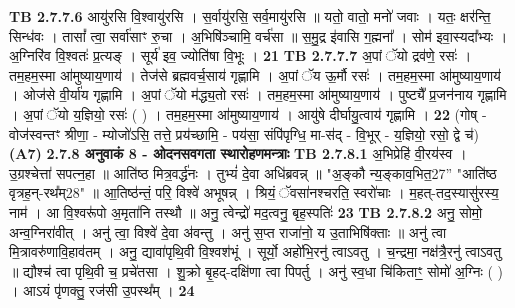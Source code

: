 \documentclass[17pt]{extarticle}
\begin{document}
{                  \newline
                                \textbf{ TB 2.7.7.6} \newline
                  आयु॑रसि वि॒श्वायु॑रसि । स॒र्वायु॑रसि॒ सर्व॒मायु॑रसि ॥ यतो॒ वातो॒ मनो॑ जवाः । यतः॒ क्षर॑न्ति॒ सिन्ध॑वः । तासां᳚ त्वा॒ सर्वा॑साꣳ रु॒चा । अ॒भिषि॑ञ्चामि॒ वर्च॑सा ॥ स॒मु॒द्र इ॑वासि ग॒ह्मना᳚ । सोम॑ इवा॒स्यदा᳚भ्यः । अ॒ग्निरि॑व वि॒श्वतः॑ प्र॒त्यङ् । सूर्य॑ इव॒ ज्योति॑षा वि॒भूः । \textbf{ 21} \newline
                  \newline
                                \textbf{ TB 2.7.7.7} \newline
                  अ॒पां ॅयो द्रव॑णे॒ रसः॑ । तम॒हम॒स्मा आ॑मुष्याय॒णाय॑ । तेज॑से ब्रह्मवर्च॒साय॑ गृह्णामि । अ॒पां ॅय ऊ॒र्मौ रसः॑ । तम॒हम॒स्मा आ॑मुष्याय॒णाय॑ । ओज॑से वी॒र्या॑य गृह्णामि । अ॒पां ॅयो म॑द्ध्य॒तो रसः॑ । तम॒हम॒स्मा आ॑मुष्याय॒णाय॑ । पुष्ट्यै᳚ प्र॒जन॑नाय गृह्णामि । अ॒पां ॅयो य॒ज्ञियो॒ रसः॑ ( ) । तम॒हम॒स्मा आ॑मुष्याय॒णाय॑ । आयु॑षे दीर्घायु॒त्वाय॑ गृह्णामि । \textbf{ 22} \newline
                  \newline
                                    (गोष् - वोज॑स्वन्तꣳ श्रीणा॒ - म्योजो॑ऽसि॒ तत्ते॒ प्रय॑च्छामि॒ - पय॑सा॒ संपि॑पृग्धि॒ मा-स॑द् - वि॒भूर् - य॒ज्ञियो॒ रसो॒ द्वे च॑) \textbf{(A7)} \newline \newline
                \textbf{ 2.7.8     अनुवाकं   8 - ओदनसवगता स्थारोहणमन्त्राः} \newline
                                \textbf{ TB 2.7.8.1} \newline
                  अ॒भिप्रेहि॑ वी॒रय॑स्व । उ॒ग्रश्चेत्ता॑ सपत्न॒हा ॥ आति॑ष्ठ मित्र॒वर्द्ध॑नः । तुभ्यं॑ दे॒वा अधि॑ब्रवन्न् ॥ "अ॒ङ्कौ न्य॒ङ्काव॒भित॒{27}” "आति॑ष्ठ वृत्रह॒न्-रथ᳚म्{28}" ॥ आ॒तिष्ठ॑न्तं॒ परि॒ विश्वे॑ अभूषन्न् । श्रियं॒ ॅवसा॑नश्चरति॒ स्वरो॑चाः । म॒हत्-तद॒स्यासु॑रस्य॒ नाम॑ । आ वि॒श्वरू॑पो अ॒मृता॑नि तस्थौ ॥ अनु॒ त्वेन्द्रो॑ मद॒त्वनु॒ बृह॒स्पतिः॑ \textbf{ 23} \newline
                  \newline
                                \textbf{ TB 2.7.8.2} \newline
                  अनु॒ सोमो॒ अन्व॒ग्निरा॑वीत् । अनु॑ त्वा॒ विश्वे॑ दे॒वा अ॑वन्तु । अनु॑ स॒प्त राजा॑नो॒ य उ॒ताभिषि॑क्ताः ॥ अनु॑ त्वा मि॒त्रावरु॑णावि॒हाव॑तम् । अनु॒ द्यावा॑पृथि॒वी वि॒श्वश॑भूं । सूर्यो॒ अहो॑भि॒रनु॑ त्वाऽवतु । च॒न्द्रमा॒ नक्ष॑त्रै॒रनु॑ त्वाऽवतु ॥ द्यौश्च॑ त्वा पृथि॒वी च॒ प्रचे॑तसा । शु॒क्रो बृ॒हद्-दक्षि॑णा त्वा पिपर्तु । अनु॑ स्व॒धा चि॑किताꣳ॒॒ सोमो॑ अ॒ग्निः ( ) । आऽयं पृ॑णक्तु॒ रज॑सी उ॒पस्थ᳚म् । \textbf{ 24} \newline
}
\end{document}
